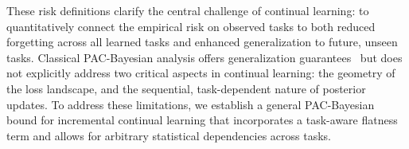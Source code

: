 \documentclass[letterpaper]{article} %
\begin{document}

These risk definitions clarify the central challenge of continual learning: to quantitatively connect the empirical risk on observed tasks to both  reduced forgetting across all learned tasks and enhanced generalization to future, unseen tasks. Classical PAC-Bayesian analysis offers generalization guarantees~ but does not explicitly address two critical aspects in continual learning: the geometry of the loss landscape, and the sequential, task-dependent nature of posterior updates. To address these limitations, we establish a general PAC-Bayesian bound for incremental continual learning that incorporates a task-aware flatness term and allows for arbitrary statistical dependencies across tasks.












\end{document}
